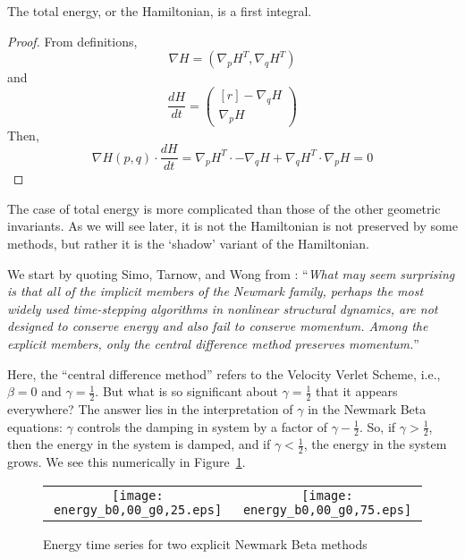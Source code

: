 \documentclass[../Main.tex]{subfiles}
\begin{document}
\begin{theorem} The total energy, or the Hamiltonian, is a first integral. \end{theorem}
\begin{proof}
From definitions,
$$
	\nabla H = \left(\nabla_{p}H^{T}, \nabla_{q}H^{T}\right)
$$
and
$$
	\frac{dH}{dt} =
		\begin{pmatrix*}[r]
			-\nabla_{q}H \\
			\nabla_{p}H
		\end{pmatrix*}
$$
Then, 
$$
\nabla H(p, q) \cdot \frac{dH}{dt} = \nabla_{p}H^{T}\cdot-\nabla_{q}H + \nabla_{q}H^{T}\cdot \nabla_{p}H = 0
$$ 
\end{proof} 

The case of total energy is more complicated than those of the other geometric invariants. As we will see later, it is not the Hamiltonian is not preserved by some methods, but rather it is the `shadow' variant of the Hamiltonian.

We start by quoting Simo, Tarnow, and Wong from \cite{SimoTarnowWong1992}:
``\textit{What may seem surprising is that all of the implicit members of the Newmark family, perhaps the most widely used time-stepping algorithms in nonlinear structural dynamics, are not designed to conserve energy and also fail to conserve momentum. Among the explicit members, only the central difference method preserves momentum.}''	

Here, the ``central difference method'' refers to the Velocity Verlet Scheme, i.e., $\beta = 0$ and $\gamma = \frac{1}{2}$. But what is so significant about $\gamma = \frac{1}{2}$ that it appears everywhere? The answer lies in the interpretation of $\gamma$ in the Newmark Beta equations: $\gamma$ controls the damping in system by a factor of $\gamma - \frac{1}{2}$. So, if $\gamma > \frac{1}{2}$, then the energy in the system is damped, and if $\gamma < \frac{1}{2}$, the energy in the system grows. We see this numerically in Figure~\ref{fig:energy_time_series_damping}. 
\begin{figure}[H]
\centering
 	\begin{tabular}{@{}cc@{}}
		\texttt{[image: energy\_b0,00\_g0,25.eps]} &
    		\texttt{[image: energy\_b0,00\_g0,75.eps]} \\
	\end{tabular}
  	\caption{Energy time series for two explicit Newmark Beta methods}
	\label{fig:energy_time_series_damping}
\end{figure}
\end{document}
